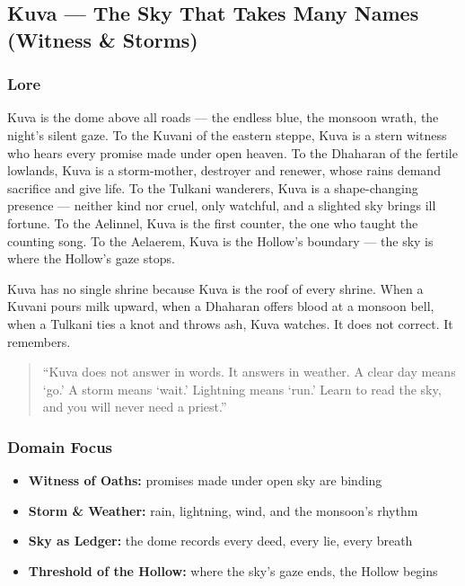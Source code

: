 
\subsection{Kuva --- The Sky That Takes Many Names (Witness \& Storms)}

\subsubsection*{Lore}
Kuva is the dome above all roads --- the endless blue, the monsoon wrath, the night's silent gaze. To the Kuvani of the eastern steppe, Kuva is a stern witness who hears every promise made under open heaven. To the Dhaharan of the fertile lowlands, Kuva is a storm-mother, destroyer and renewer, whose rains demand sacrifice and give life. To the Tulkani wanderers, Kuva is a shape-changing presence --- neither kind nor cruel, only watchful, and a slighted sky brings ill fortune. To the Aelinnel, Kuva is the first counter, the one who taught the counting song. To the Aelaerem, Kuva is the Hollow's boundary --- the sky is where the Hollow's gaze stops.

Kuva has no single shrine because Kuva is the roof of every shrine. When a Kuvani pours milk upward, when a Dhaharan offers blood at a monsoon bell, when a Tulkani ties a knot and throws ash, Kuva watches. It does not correct. It remembers.

\begin{quote}
``Kuva does not answer in words. It answers in weather. A clear day means `go.' A storm means `wait.' Lightning means `run.' Learn to read the sky, and you will never need a priest.''
\end{quote}

\subsubsection*{Domain Focus}
\begin{itemize}
  \item \textbf{Witness of Oaths:} promises made under open sky are binding
  \item \textbf{Storm \& Weather:} rain, lightning, wind, and the monsoon's rhythm
  \item \textbf{Sky as Ledger:} the dome records every deed, every lie, every breath
  \item \textbf{Threshold of the Hollow:} where the sky's gaze ends, the Hollow begins
\end{itemize}


